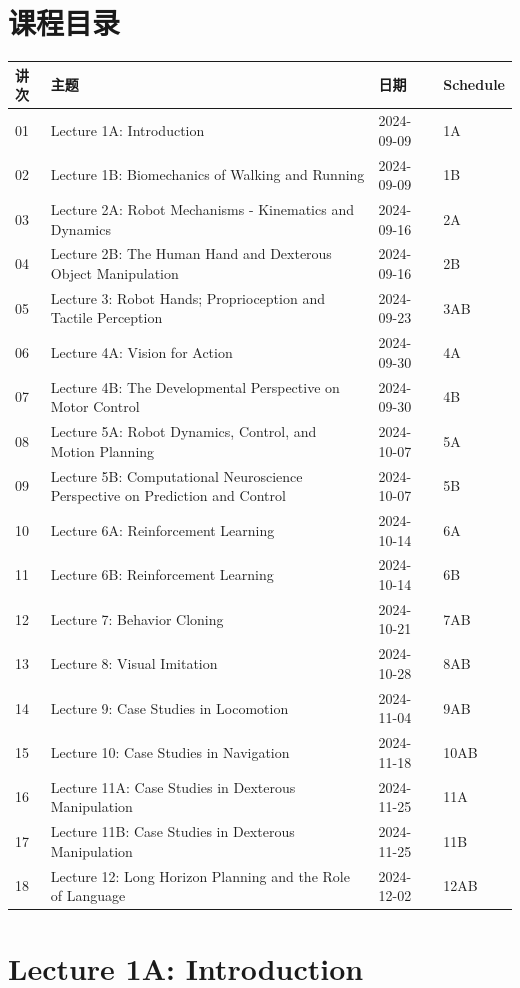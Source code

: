 \documentclass[a4paper]{article}
\begin{document}
\section*{课程目录}
\begin{longtable}{p{}p{}p{}p{}}
\textbf{讲次} & \textbf{主题} & \textbf{日期} & \textbf{Schedule}\\
\hline
01 & Lecture 1A: Introduction & 2024-09-09 & 1A\\
02 & Lecture 1B: Biomechanics of Walking and Running & 2024-09-09 & 1B\\
03 & Lecture 2A: Robot Mechanisms - Kinematics and Dynamics & 2024-09-16 & 2A\\
04 & Lecture 2B: The Human Hand and Dexterous Object Manipulation & 2024-09-16 & 2B\\
05 & Lecture 3: Robot Hands; Proprioception and Tactile Perception & 2024-09-23 & 3AB\\
06 & Lecture 4A: Vision for Action & 2024-09-30 & 4A\\
07 & Lecture 4B: The Developmental Perspective on Motor Control & 2024-09-30 & 4B\\
08 & Lecture 5A: Robot Dynamics, Control, and Motion Planning & 2024-10-07 & 5A\\
09 & Lecture 5B: Computational Neuroscience Perspective on Prediction and Control & 2024-10-07 & 5B\\
10 & Lecture 6A: Reinforcement Learning & 2024-10-14 & 6A\\
11 & Lecture 6B: Reinforcement Learning & 2024-10-14 & 6B\\
12 & Lecture 7: Behavior Cloning & 2024-10-21 & 7AB\\
13 & Lecture 8: Visual Imitation & 2024-10-28 & 8AB\\
14 & Lecture 9: Case Studies in Locomotion & 2024-11-04 & 9AB\\
15 & Lecture 10: Case Studies in Navigation & 2024-11-18 & 10AB\\
16 & Lecture 11A: Case Studies in Dexterous Manipulation & 2024-11-25 & 11A\\
17 & Lecture 11B: Case Studies in Dexterous Manipulation & 2024-11-25 & 11B\\
18 & Lecture 12: Long Horizon Planning and the Role of Language & 2024-12-02 & 12AB\\
\end{longtable}

\section{Lecture 1A: Introduction}

\end{document}
